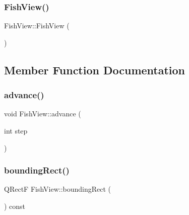 \subsubsection{\texorpdfstring{Fish\+View()}{FishView()}}
{\footnotesize\ttfamily Fish\+View\+::\+Fish\+View (\begin{DoxyParamCaption}{ }\end{DoxyParamCaption})}



\subsection{Member Function Documentation}
\mbox{\label{classFishView_aa036988238ee305e0d5f2c8d117af9ec_aa036988238ee305e0d5f2c8d117af9ec}} 
\subsubsection{\texorpdfstring{advance()}{advance()}}
{\footnotesize\ttfamily void Fish\+View\+::advance (\begin{DoxyParamCaption}\item[{int}]{step }\end{DoxyParamCaption})\hspace{0.3cm}{\ttfamily [protected]}}

\mbox{\label{classFishView_a6f48c2edec8894fefbdf78a30dfaea6b_a6f48c2edec8894fefbdf78a30dfaea6b}} 
\subsubsection{\texorpdfstring{bounding\+Rect()}{boundingRect()}}
{\footnotesize\ttfamily Q\+RectF Fish\+View\+::bounding\+Rect (\begin{DoxyParamCaption}{ }\end{DoxyParamCaption}) const}

\mbox{\label{classFishView_a1b51f33fd2877a28393c3f2649979e80_a1b51f33fd2877a28393c3f2649979e80}} 
